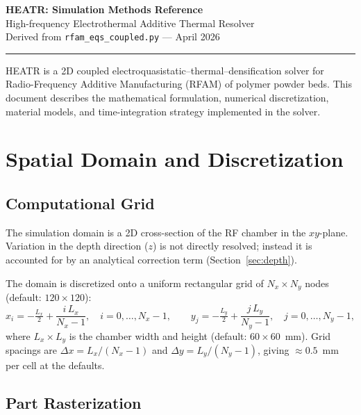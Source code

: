 \documentclass[11pt, letterpaper]{article}
\begin{document}
\begin{center}
  {\LARGE \textbf{HEATR: Simulation Methods Reference}}\\[0.4em]
  {\large High-frequency Electrothermal Additive Thermal Resolver}\\[0.6em]
  {\small\color{gray}Derived from \texttt{rfam\_eqs\_coupled.py} --- April 2026}
\end{center}

\vspace{0.3em}\noindent\color{ruleclr}\hrule\vspace{1em}

\noindent
HEATR is a 2D coupled electroquasistatic--thermal--densification solver for
Radio-Frequency Additive Manufacturing (RFAM) of polymer powder beds.
This document describes the mathematical formulation, numerical discretization,
material models, and time-integration strategy implemented in the solver.

\section{Spatial Domain and Discretization}

\subsection{Computational Grid}

The simulation domain is a 2D cross-section of the RF chamber in the $xy$-plane.
Variation in the depth direction ($z$) is not directly resolved; instead it is
accounted for by an analytical correction term (Section~\ref{sec:depth}).

The domain is discretized onto a uniform rectangular grid of
$N_x \times N_y$ nodes (default: $120 \times 120$):
%
\begin{equation}
  x_i = -\tfrac{L_x}{2} + \frac{i\,L_x}{N_x - 1},\quad i = 0,\ldots,N_x-1,
  \qquad
  y_j = -\tfrac{L_y}{2} + \frac{j\,L_y}{N_y - 1},\quad j = 0,\ldots,N_y-1,
\end{equation}
%
where $L_x \times L_y$ is the chamber width and height (default: $60\times60$~mm).
Grid spacings are $\Delta x = L_x/(N_x-1)$ and $\Delta y = L_y/(N_y-1)$,
giving $\approx 0.5$~mm per cell at the defaults.

\subsection{Part Rasterization}
\end{document}
